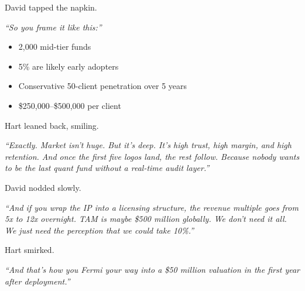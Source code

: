 David tapped the napkin.

\textit{``So you frame it like this:''}

\begin{itemize}
  \item 2{,}000 mid-tier funds  
  \item 5\% are likely early adopters  
  \item Conservative 50-client penetration over 5 years  
  \item \$250{,}000–\$500{,}000 per client
\end{itemize}

Hart leaned back, smiling.

\textit{``Exactly. Market isn’t huge. But it’s deep. It's high trust, high margin, and high retention.  
And once the first five logos land, the rest follow.  
Because nobody wants to be the last quant fund without a real-time audit layer.''}

David nodded slowly.

\textit{``And if you wrap the IP into a licensing structure, the revenue multiple goes from 5x to 12x overnight.  
TAM is maybe \$500 million globally. We don’t need it all. We just need the perception that we could take 10\%.''}

Hart smirked.

\textit{``And that’s how you Fermi your way into a \$50 million valuation in the first year after deployment.''}


\medskip

